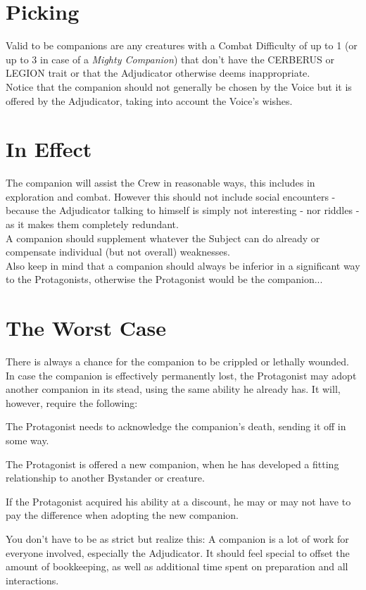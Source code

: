 \documentclass[12pt,a4paper,openany,usenames,dvipsnames]{book}
\begin{document}
	\section{Picking}
	Valid to be companions are any creatures with a Combat Difficulty of up to 1
		(or up to 3 in case of a \textit{Mighty Companion})
		that don't have the CERBERUS or LEGION trait
		or that the Adjudicator otherwise deems inappropriate.\\
	Notice that the companion should not generally be chosen by the Voice
		but it is offered by the Adjudicator,
		taking into account the Voice's wishes.
	\section{In Effect}
	The companion will assist the Crew in reasonable ways,
		this includes in exploration and combat.
	However this should not include social encounters
		- because the Adjudicator talking to himself is simply not interesting
		- nor riddles
		- as it makes them completely redundant.\\
	A companion should supplement whatever the Subject can do already or compensate individual (but not overall) weaknesses.\\
	Also keep in mind that a companion should always be inferior in a significant way to the Protagonists,
		otherwise the Protagonist would be the companion...
	\section{The Worst Case}
	There is always a chance for the companion to be crippled or lethally wounded.
	In case the companion is effectively permanently lost,
		the Protagonist may adopt another companion in its stead,
		using the same ability he already has.
	It will, however, require the following:
	\begin{sitemize}[8]
		\item The Protagonist needs to acknowledge the companion's death, sending it off in some way.
		\item The Protagonist is offered a new companion, when he has developed a fitting relationship to another Bystander or creature.
		\item If the Protagonist acquired his ability at a discount, he may or may not have to pay the difference when adopting the new companion.
	\end{sitemize}
	\begin{exampleblock}
		You don't have to be as strict but realize this:
		A companion is a lot of work for everyone involved, especially the Adjudicator.
		It should feel special to offset the amount of bookkeeping,
			as well as additional time spent on preparation and all interactions.
	\end{exampleblock}
	
\end{document}
